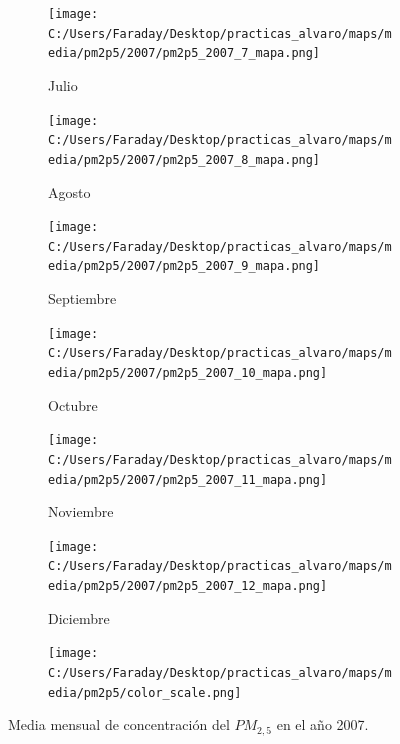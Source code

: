 \documentclass[12pt]{article}
\begin{document}
\begin{figure}[H]
\begin{subfigure}[H]{0.15\textwidth}
\texttt{[image: C:/Users/Faraday/Desktop/practicas\_alvaro/maps/media/pm2p5/2007/pm2p5\_2007\_7\_mapa.png]}
\captionsetup{labelformat=empty}
\caption{Julio}
\label{fig:map-pm2p5-2007-7}
\end{subfigure}
%
\begin{subfigure}[H]{0.15\textwidth}
\texttt{[image: C:/Users/Faraday/Desktop/practicas\_alvaro/maps/media/pm2p5/2007/pm2p5\_2007\_8\_mapa.png]}
\captionsetup{labelformat=empty}
\caption{Agosto}
\label{fig:map-pm2p5-2007-8}
\end{subfigure}
%
\begin{subfigure}[H]{0.15\textwidth}
\texttt{[image: C:/Users/Faraday/Desktop/practicas\_alvaro/maps/media/pm2p5/2007/pm2p5\_2007\_9\_mapa.png]}
\captionsetup{labelformat=empty}
\caption{Septiembre}
\label{fig:map-pm2p5-2007-9}
\end{subfigure}
%
\begin{subfigure}[H]{0.15\textwidth}
\texttt{[image: C:/Users/Faraday/Desktop/practicas\_alvaro/maps/media/pm2p5/2007/pm2p5\_2007\_10\_mapa.png]}
\captionsetup{labelformat=empty}
\caption{Octubre}
\label{fig:map-pm2p5-2007-10}
\end{subfigure}
%
\begin{subfigure}[H]{0.15\textwidth}
\texttt{[image: C:/Users/Faraday/Desktop/practicas\_alvaro/maps/media/pm2p5/2007/pm2p5\_2007\_11\_mapa.png]}
\captionsetup{labelformat=empty}
\caption{Noviembre}
\label{fig:map-pm2p5-2007-11}
\end{subfigure}
%
\begin{subfigure}[H]{0.15\textwidth}
\texttt{[image: C:/Users/Faraday/Desktop/practicas\_alvaro/maps/media/pm2p5/2007/pm2p5\_2007\_12\_mapa.png]}
\captionsetup{labelformat=empty}
\caption{Diciembre}
\label{fig:map-pm2p5-2007-12}
\end{subfigure}

\begin{subfigure}[H]{0.45\textwidth}
\texttt{[image: C:/Users/Faraday/Desktop/practicas\_alvaro/maps/media/pm2p5/color\_scale.png]}
\captionsetup{labelformat=empty}
\caption{}
\end{subfigure}

\vspace*{-7mm}
\caption{Media mensual de concentración del $PM_{2,5}$ en el año 2007.}
\label{fig:map-pm2p5-2007}
\end{figure}
\end{document}
